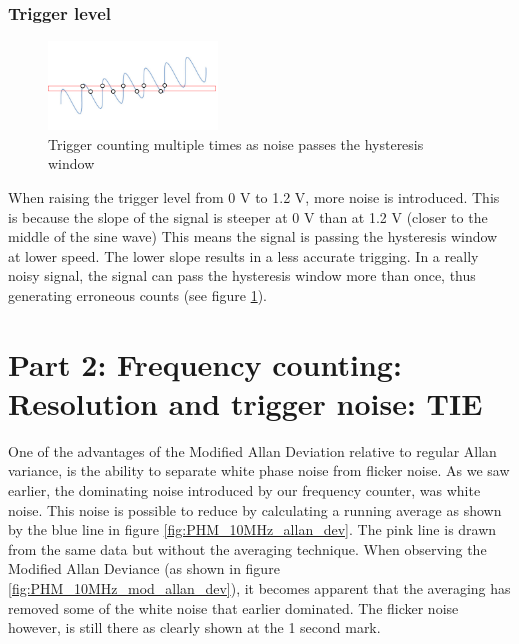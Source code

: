 \documentclass[11pt,english,a4paper]{article}
\begin{document}
\subsubsection{Trigger level}
\begin{figure}
  \centering
  \includegraphics[width=0.40\textwidth]{hysteresis.pdf}
  \caption{Trigger counting multiple times as noise passes the hysteresis window}
    \label{fig:hysteresis}
\end{figure}
When raising the trigger level from 0 V to 1.2 V, more noise is introduced. This is because the slope of the signal is steeper at 0 V than at 1.2 V (closer to the middle of the sine wave) This means the signal is passing the hysteresis window at lower speed. The lower slope results in a less accurate trigging. In a really noisy signal, the signal can pass the hysteresis window more than once, thus generating erroneous counts (see figure \ref{fig:hysteresis}). 

\section{Part 2: Frequency counting: Resolution and trigger noise: TIE}
One of the advantages of the Modified Allan Deviation relative to regular Allan variance, is the ability to separate white phase noise from flicker noise. As we saw earlier, the dominating noise introduced by our frequency counter, was white noise. This noise is possible to reduce by calculating a running average as shown by the blue line in figure \ref{fig:PHM_10MHz_allan_dev}. The pink line is drawn from the same data but without the averaging technique. When observing the Modified Allan Deviance (as shown in figure \ref{fig:PHM_10MHz_mod_allan_dev}), it becomes apparent that the averaging has removed some of the white noise that earlier dominated. The flicker noise however, is still there as clearly shown at the 1 second mark. 
\end{document}
